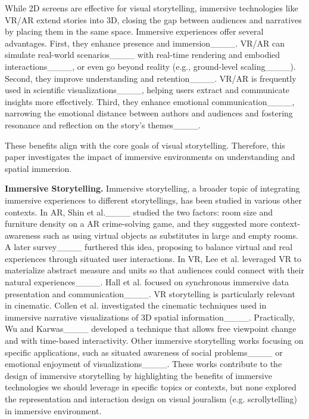 While 2D screens are effective for visual storytelling, immersive technologies like VR/AR extend stories into 3D, closing the gap between audiences and narratives by placing them in the same space. Immersive experiences offer several advantages.
First, they enhance presence and immersion____. VR/AR can simulate real-world scenarios____ with real-time rendering and embodied interactions____, or even go beyond reality (e.g., ground-level scaling____).
Second, they improve understanding and retention____. VR/AR is frequently used in scientific visualizations____, helping users extract and communicate insights more effectively.
Third, they enhance emotional communication____, narrowing the emotional distance between authors and audiences and fostering resonance and reflection on the story's themes____.

These benefits align with the core goals of visual storytelling. Therefore, this paper investigates the impact of immersive environments on understanding and spatial immersion.

\noindent\textbf{Immersive Storytelling.}
Immersive storytelling, a broader topic of integrating immersive experiences to different storytellings, has been studied in various other contexts. {In AR, Shin et al.____ studied the two factors: room size and furniture density on a AR crime-solving game, and they suggested more context-awareness such as using virtual objects as substitutes in large and empty rooms. A later survey____ furthered this idea, proposing to balance virtual and real experiences through situated user interactions. In VR,} Lee et al. leveraged VR to materialize abstract measure and units so that audiences could connect with their natural experiences____. Hall et al. focused on synchronous immersive data presentation and communication____. {VR storytelling is particularly relevant in cinematic.} Collen et al. investigated the cinematic techniques used in immersive narrative visualizations of 3D spatial information____. {Practically, Wu and Karwas____ developed a technique that allows free viewpoint change and with time-based interactivity.} Other immersive storytelling works focusing on specific applications, such as situated awareness of social problems____ or emotional enjoyment of visualizations____. These works contribute to the design of immersive storytelling by highlighting the benefits of immersive technologies we should leverage in specific topics or contexts, but none explored the representation and interaction design on visual jouralism (e.g. scrollytelling) in immersive environment. 


